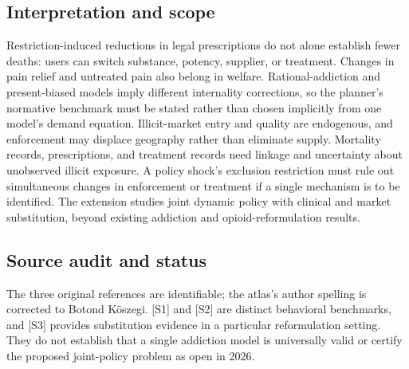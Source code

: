 \documentclass[11pt,a4paper]{article}
\begin{document}
\subsection*{Interpretation and scope}
Restriction-induced reductions in legal prescriptions do not alone establish fewer deaths: users can switch substance, potency, supplier, or treatment. Changes in pain relief and untreated pain also belong in welfare. Rational-addiction and present-biased models imply different internality corrections, so the planner's normative benchmark must be stated rather than chosen implicitly from one model's demand equation. Illicit-market entry and quality are endogenous, and enforcement may displace geography rather than eliminate supply. Mortality records, prescriptions, and treatment records need linkage and uncertainty about unobserved illicit exposure. A policy shock's exclusion restriction must rule out simultaneous changes in enforcement or treatment if a single mechanism is to be identified. The extension studies joint dynamic policy with clinical and market substitution, beyond existing addiction and opioid-reformulation results.

\subsection*{Source audit and status}
The three original references are identifiable; the atlas's author spelling is corrected to Botond Köszegi. [S1] and [S2] are distinct behavioral benchmarks, and [S3] provides substitution evidence in a particular reformulation setting. They do not establish that a single addiction model is universally valid or certify the proposed joint-policy problem as open in 2026.
\end{document}

